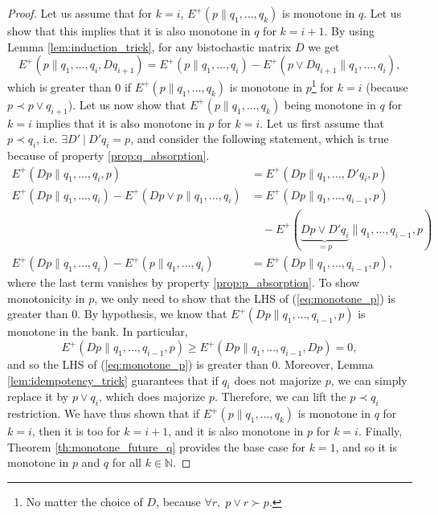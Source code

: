 \begin{proof}
    Let us assume that for $k = i$, $E^+(p \parallel q_1, \dots, q_k)$ is monotone in $q$. Let us show that this implies that it is also monotone in $q$ for $k = i+1$. By using Lemma \ref{lem:induction_trick}, for any bistochastic matrix $D$ we get
    \begin{equation}
        E^+(p \parallel q_1, \dots, q_i, Dq_{i+1}) = E^+(p \parallel q_1, \dots, q_i) - E^+(p \vee Dq_{i+1} \parallel q_1, \dots, q_i),
    \end{equation}
    which is greater than 0 if $E^+(p \parallel q_1, \dots, q_k)$ is monotone in $p$\footnote{No matter the choice of $D$,  because $\forall r, \; p \vee r \succ p.$} for $k = i$ (because $p \prec p \vee {q_{i+1}}$). Let us now show that $E^+(p \parallel q_1, \dots, q_k)$ being monotone in $q$ for $k = i$ implies that it is also monotone in $p$ for $k = i$. Let us first assume that $p \prec q_i$, i.e. $\exists D' \: | \: D' q_i = p$, and consider the following statement, which is true because of property \ref{prop:q_absorption}.
    \begin{align}
        E^+(Dp \parallel q_1, \dots, q_i, p) &= E^+(Dp \parallel q_1, \dots, D'q_i, p) \\
        E^+(Dp \parallel q_1, \dots, q_i) - E^+(Dp \vee p \parallel q_1, \dots, q_i) &= E^+(Dp \parallel q_1, \dots, q_{i-1}, p)\nonumber\\
        &\quad - E^+(\underbrace{Dp \vee D'q_i}_{=p} \parallel q_1, \dots, q_{i-1}, p)\\
        E^+(Dp \parallel q_1, \dots, q_i) - E^+(p \parallel q_1, \dots, q_i) &= E^+(Dp \parallel q_1, \dots, q_{i-1}, p), \label{eq:monotone_p}
    \end{align}
    where the last term vanishes by property \ref{prop:p_absorption}. To show monotonicity in $p$, we only need to show that the LHS of (\ref{eq:monotone_p}) is greater than 0. By hypothesis, we know that $E^+(Dp \parallel q_1, \dots, q_{i-1}, p)$ is monotone in the bank. In particular,
    \begin{equation}
        E^+(Dp \parallel q_1, \dots, q_{i-1}, p) \geq E^+(Dp \parallel q_1, \dots, q_{i-1}, Dp) = 0,
    \end{equation}
    and so the LHS of (\ref{eq:monotone_p}) is greater than 0. Moreover, Lemma \ref{lem:idempotency_trick} guarantees that if $q_i$ does not majorize $p$, we can simply replace it by $p \vee q_i$, which does majorize $p$. Therefore, we can lift the $p \prec q_i$ restriction. We have thus shown that if $E^+(p \parallel q_1, \dots, q_k)$ is monotone in $q$ for $k = i$, then it is too for $k = i+1$, and it is also monotone in $p$ for $k = i$. Finally, Theorem \ref{th:monotone_future_q} provides the base case for $k = 1$, and so it is monotone in $p$ and $q$ for all $k \in \mathbb{N}$. \qedhere
\end{proof}

